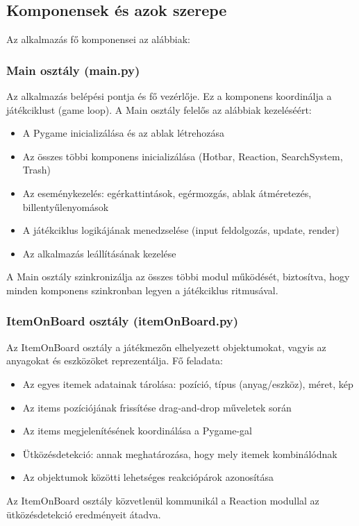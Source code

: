 \documentclass[]{thesis-ekf}
\begin{document}
	\subsection{Komponensek és azok szerepe}
	
	Az alkalmazás fő komponensei az alábbiak:
	
	\subsubsection{Main osztály (main.py)}
	
	Az alkalmazás belépési pontja és fő vezérlője. Ez a komponens koordinálja a játékciklust (game loop). A Main osztály felelős az alábbiak kezeléséért:
	\begin{itemize}
		\item A Pygame inicializálása és az ablak létrehozása
		\item Az összes többi komponens inicializálása (Hotbar, Reaction, SearchSystem, Trash)
		\item Az eseménykezelés: egérkattintások, egérmozgás, ablak átméretezés, billentyűlenyomások
		\item A játékciklus logikájának menedzselése (input feldolgozás, update, render)
		\item Az alkalmazás leállításának kezelése
	\end{itemize}
	
	A Main osztály szinkronizálja az összes többi modul működését, biztosítva, hogy minden komponens szinkronban legyen a játékciklus ritmusával.
	
	\subsubsection{ItemOnBoard osztály (itemOnBoard.py)}
	
	Az ItemOnBoard osztály a játékmezőn elhelyezett objektumokat, vagyis az anyagokat és eszközöket reprezentálja.
	Fő feladata:
	\begin{itemize}
		\item Az egyes itemek adatainak tárolása: pozíció, típus (anyag/eszköz), méret, kép
		\item Az items pozíciójának frissítése drag-and-drop műveletek során
		\item Az items megjelenítésének koordinálása a Pygame-gal
		\item Ütközésdetekció: annak meghatározása, hogy mely itemek kombinálódnak\cite{Kombination}
		\item Az objektumok közötti lehetséges reakciópárok azonosítása
	\end{itemize}
	Az ItemOnBoard osztály közvetlenül kommunikál a Reaction modullal az ütközésdetekció eredményeit átadva.
	
\end{document}
